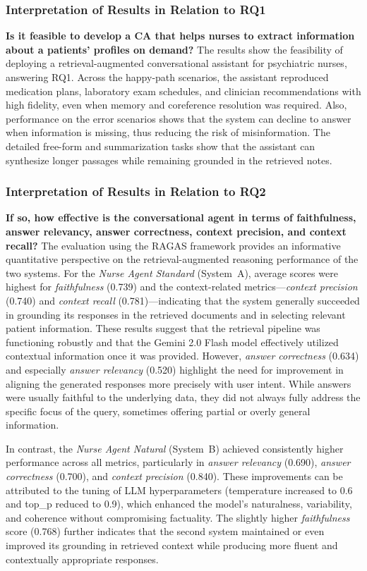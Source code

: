 \subsubsection{Interpretation of Results in Relation to RQ1}
\textbf{Is it feasible to develop a CA that helps nurses to extract information about a patients’ profiles on demand?}
The results show the feasibility of deploying a retrieval-augmented conversational assistant for psychiatric nurses, answering RQ1. Across the happy-path scenarios, the assistant reproduced medication plans, laboratory exam schedules, and clinician recommendations with high fidelity, even when memory and coreference resolution was required. Also, performance on the error scenarios shows that the system can decline to answer when information is missing, thus reducing the risk of misinformation. The detailed free-form and summarization tasks show that the assistant can synthesize longer passages while remaining grounded in the retrieved notes.


\subsubsection{Interpretation of Results in Relation to RQ2}
\textbf{If so, how effective is the conversational agent in terms of faithfulness, answer relevancy, answer correctness, context precision, and context recall?}
The evaluation using the RAGAS framework provides an informative quantitative perspective on the retrieval-augmented reasoning performance of the two systems. For the \textit{Nurse Agent Standard} (System~A), average scores were highest for \textit{faithfulness} (0.739) and the context-related metrics—\textit{context precision} (0.740) and \textit{context recall} (0.781)—indicating that the system generally succeeded in grounding its responses in the retrieved documents and in selecting relevant patient information. These results suggest that the retrieval pipeline was functioning robustly and that the Gemini 2.0 Flash model effectively utilized contextual information once it was provided. However, \textit{answer correctness} (0.634) and especially \textit{answer relevancy} (0.520) highlight the need for improvement in aligning the generated responses more precisely with user intent. While answers were usually faithful to the underlying data, they did not always fully address the specific focus of the query, sometimes offering partial or overly general information.  

In contrast, the \textit{Nurse Agent Natural} (System~B) achieved consistently higher performance across all metrics, particularly in \textit{answer relevancy} (0.690), \textit{answer correctness} (0.700), and \textit{context precision} (0.840). These improvements can be attributed to the tuning of LLM hyperparameters (temperature increased to 0.6 and top\_p reduced to 0.9), which enhanced the model’s naturalness, variability, and coherence without compromising factuality. The slightly higher \textit{faithfulness} score (0.768) further indicates that the second system maintained or even improved its grounding in retrieved context while producing more fluent and contextually appropriate responses.

